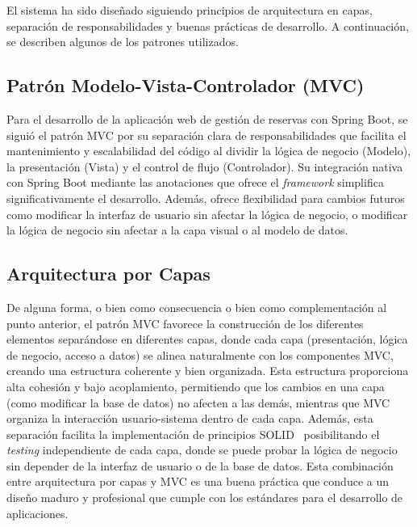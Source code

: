 El sistema ha sido diseñado siguiendo principios de arquitectura en capas, separación de responsabilidades y buenas prácticas de desarrollo. A continuación, se describen algunos de los patrones utilizados.

\subsection{Patrón Modelo-Vista-Controlador (MVC)}\label{patron-modelo-vista-controlador}
Para el desarrollo de la aplicación web de gestión de reservas con Spring Boot, se siguió el patrón MVC por su separación clara de responsabilidades que facilita el mantenimiento y escalabilidad del código al dividir la lógica de negocio (Modelo), la presentación (Vista) y el control de flujo (Controlador). Su integración nativa con Spring Boot mediante las anotaciones que ofrece el \emph{framework} simplifica significativamente el desarrollo. Además, ofrece flexibilidad para cambios futuros como modificar la interfaz de usuario sin afectar la lógica de negocio, o modificar la lógica de negocio sin afectar a la capa visual o al modelo de datos.

\subsection{Arquitectura por Capas}\label{arquitectura-por-capas}
De alguna forma, o bien como consecuencia o bien como complementación al punto anterior, el patrón MVC favorece la construcción de los diferentes elementos separándose en diferentes capas, donde cada capa (presentación, lógica de negocio, acceso a datos) se alinea naturalmente con los componentes MVC, creando una estructura coherente y bien organizada. Esta estructura proporciona alta cohesión y bajo acoplamiento, permitiendo que los cambios en una capa (como modificar la base de datos) no afecten a las demás, mientras que MVC organiza la interacción usuario-sistema dentro de cada capa. Además, esta separación facilita la implementación de principios SOLID~\cite{solid} posibilitando el \emph{testing} independiente de cada capa, donde se puede probar la lógica de negocio sin depender de la interfaz de usuario o de la base de datos. Esta combinación entre arquitectura por capas y MVC es una buena práctica que conduce a un diseño maduro y profesional que cumple con los estándares para el desarrollo de aplicaciones.

